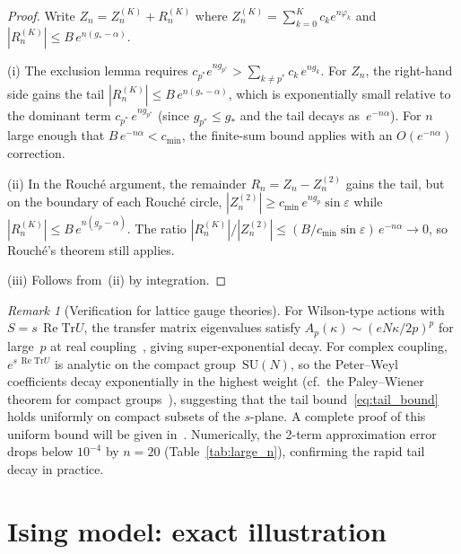 \documentclass[12pt]{article}
\theoremstyle{definition}
\theoremstyle{remark}
\newtheorem{remark}[theorem]{Remark}
\newcommand{\SU}{\mathrm{SU}}
\newcommand{\Tr}{\mathrm{Tr}}
\newcommand{\re}{\operatorname{Re}}
\begin{document}
\begin{proof}
Write $Z_n = Z_n^{(K)} + R_n^{(K)}$ where
$Z_n^{(K)} = \sum_{k=0}^K c_k e^{n\varphi_k}$ and
$|R_n^{(K)}| \leq B\,e^{n(g_* - \alpha)}$.

\textup{(i)} The exclusion lemma requires
$c_{p^*} e^{ng_{p^*}} > \sum_{k \neq p^*} c_k\,e^{ng_k}$.
For $Z_n$, the right-hand side gains the tail
$|R_n^{(K)}| \leq B\,e^{n(g_* - \alpha)}$, which is exponentially
small relative to the dominant term $c_{p^*}\,e^{ng_{p^*}}$
(since $g_{p^*} \leq g_*$ and the tail decays as~$e^{-n\alpha}$).
For $n$ large enough that $B\,e^{-n\alpha} < c_{\min}$,
the finite-sum bound applies with an $O(e^{-n\alpha})$ correction.

\textup{(ii)} In the Rouch\'e argument, the remainder
$R_n = Z_n - Z_n^{(2)}$ gains the tail, but on the boundary of
each Rouch\'e circle,
$|Z_n^{(2)}| \geq c_{\min}\,e^{ng_p}\sin\varepsilon$
while $|R_n^{(K)}| \leq B\,e^{n(g_p - \alpha)}$.  The ratio
$|R_n^{(K)}|/|Z_n^{(2)}| \leq (B/c_{\min}\sin\varepsilon)\,
e^{-n\alpha} \to 0$,
so Rouch\'e's theorem still applies.

\textup{(iii)} Follows from~(ii) by integration.
\end{proof}

\begin{remark}[Verification for lattice gauge theories]\label{rem:gauge_tail}
For Wilson-type actions with $S = s\,\re\Tr U$, the transfer matrix
eigenvalues satisfy $A_p(\kappa) \sim (eN\kappa/2p)^p$ for
large~$p$ at real coupling~\cite{OlbrykChi}, giving
super-exponential decay.
For complex coupling, $e^{s\,\re\Tr U}$ is analytic on the compact
group~$\SU(N)$, so the Peter--Weyl coefficients decay exponentially
in the highest weight (cf.~the Paley--Wiener theorem for compact
groups~\cite{Sugiura1990}), suggesting that the tail
bound~\eqref{eq:tail_bound} holds uniformly on compact subsets of
the $s$-plane.  A complete proof of this uniform bound will be given
in~\cite{OlbrykChi}.
Numerically, the 2-term approximation error drops below $10^{-4}$
by $n = 20$ (Table~\ref{tab:large_n}), confirming the rapid tail
decay in practice.
\end{remark}


\section{Ising model: exact illustration}
\label{sec:ising}
\end{document}
